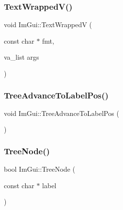 \hypertarget{namespace_im_gui_a9019a388cd0c410bcb3d3ae63a008123}{}\label{namespace_im_gui_a9019a388cd0c410bcb3d3ae63a008123} 
\subsubsection{\texorpdfstring{Text\+Wrapped\+V()}{TextWrappedV()}}
{\footnotesize\ttfamily void Im\+Gui\+::\+Text\+WrappedV (\begin{DoxyParamCaption}\item[{const char $\ast$}]{fmt,  }\item[{va\+\_\+list}]{args }\end{DoxyParamCaption})}

\hypertarget{namespace_im_gui_a54e15c2f65cea3aeddd66b5dcfb45716}{}\label{namespace_im_gui_a54e15c2f65cea3aeddd66b5dcfb45716} 
\subsubsection{\texorpdfstring{Tree\+Advance\+To\+Label\+Pos()}{TreeAdvanceToLabelPos()}}
{\footnotesize\ttfamily void Im\+Gui\+::\+Tree\+Advance\+To\+Label\+Pos (\begin{DoxyParamCaption}{ }\end{DoxyParamCaption})}

\hypertarget{namespace_im_gui_a4dff507ce8bbe0da9556bb50b1e60d7f}{}\label{namespace_im_gui_a4dff507ce8bbe0da9556bb50b1e60d7f} 
\subsubsection{\texorpdfstring{Tree\+Node()}{TreeNode()}\hspace{0.1cm}{\footnotesize\ttfamily [1/3]}}
{\footnotesize\ttfamily bool Im\+Gui\+::\+Tree\+Node (\begin{DoxyParamCaption}\item[{const char $\ast$}]{label }\end{DoxyParamCaption})}

\hypertarget{namespace_im_gui_a6e6e4de20291002430854cbd8cd58843}{}\label{namespace_im_gui_a6e6e4de20291002430854cbd8cd58843} 
